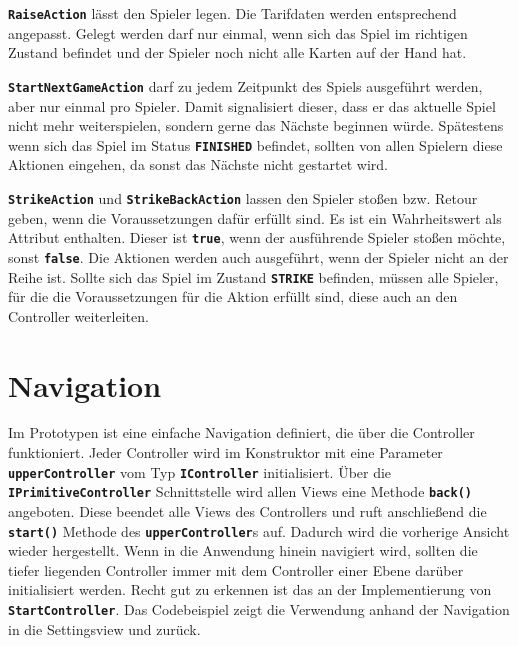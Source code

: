 \documentclass[
							a4paper, 
							11pt, 
							openany, 
							liststotoc,
							parskip=half, 
   							headings=normal
						]{scrreprt}
\begin{document}
{\textbf{\texttt{RaiseAction}} lässt den Spieler legen. Die Tarifdaten werden entsprechend angepasst. Gelegt werden darf nur einmal, wenn sich das Spiel im richtigen Zustand befindet und der Spieler noch nicht alle Karten auf der Hand hat.

\textbf{\texttt{StartNextGameAction}} darf zu jedem Zeitpunkt des Spiels ausgeführt werden, aber nur einmal pro Spieler. Damit signalisiert dieser, dass er das aktuelle Spiel nicht mehr weiterspielen, sondern gerne das Nächste beginnen würde. Spätestens wenn sich das Spiel im Status \textbf{\texttt{FINISHED}} befindet, sollten von allen Spielern diese Aktionen eingehen, da sonst das Nächste nicht gestartet wird.

\textbf{\texttt{StrikeAction}} und \textbf{\texttt{StrikeBackAction}} lassen den Spieler stoßen bzw. Retour geben, wenn die Voraussetzungen dafür erfüllt sind. Es ist ein Wahrheitswert als Attribut enthalten. Dieser ist \textbf{\texttt{true}}, wenn der ausführende Spieler stoßen möchte, sonst \textbf{\texttt{false}}. Die Aktionen werden auch ausgeführt, wenn der Spieler nicht an der Reihe ist. Sollte sich das Spiel im Zustand \textbf{\texttt{STRIKE}} befinden, müssen alle Spieler, für die die Voraussetzungen für die Aktion erfüllt sind, diese auch an den Controller weiterleiten.
\section{Navigation} \label{se:anwendung_navigation}
Im Prototypen ist eine einfache Navigation definiert, die über die Controller funktioniert. Jeder Controller wird im Konstruktor mit eine Parameter \textbf{\texttt{upperController}} vom Typ \textbf{\texttt{IController}} initialisiert.
Über die \textbf{\texttt{IPrimitiveController}} Schnittstelle wird allen Views eine Methode \textbf{\texttt{back()}} angeboten. Diese beendet alle Views des Controllers und ruft anschließend die \textbf{\texttt{start()}} Methode des \textbf{\texttt{upperController}}s auf. Dadurch wird die vorherige Ansicht wieder hergestellt.\newline
Wenn in die Anwendung hinein navigiert wird, sollten die tiefer liegenden Controller immer mit dem Controller einer Ebene darüber initialisiert werden. Recht gut zu erkennen ist das an der Implementierung von \textbf{\texttt{StartController}}.
Das Codebeispiel zeigt die Verwendung anhand der Navigation in die Settingsview und zurück.\bigskip

}
\end{document}
